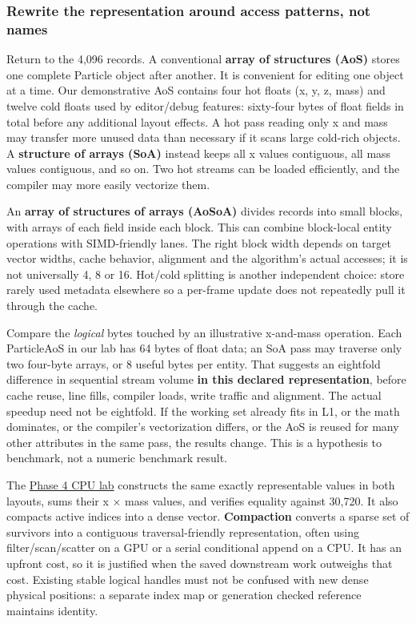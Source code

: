 \subsubsection{Rewrite the representation around access patterns, not names}\label{rewrite-the-representation-around-access-patterns-not-names}

Return to the 4,096 records. A conventional \textbf{array of structures (AoS)} stores one complete Particle object after another. It is convenient for editing one object at a time. Our demonstrative AoS contains four hot floats (x, y, z, mass) and twelve cold floats used by editor/debug features: sixty-four bytes of float fields in total before any additional layout effects. A hot pass reading only x and mass may transfer more unused data than necessary if it scans large cold-rich objects. A \textbf{structure of arrays (SoA)} instead keeps all x values contiguous, all mass values contiguous, and so on. Two hot streams can be loaded efficiently, and the compiler may more easily vectorize them.

An \textbf{array of structures of arrays (AoSoA)} divides records into small blocks, with arrays of each field inside each block. This can combine block-local entity operations with SIMD-friendly lanes. The right block width depends on target vector widths, cache behavior, alignment and the algorithm's actual accesses; it is not universally 4, 8 or 16. Hot/cold splitting is another independent choice: store rarely used metadata elsewhere so a per-frame update does not repeatedly pull it through the cache.

Compare the \emph{logical} bytes touched by an illustrative x-and-mass operation. Each ParticleAoS in our lab has 64 bytes of float data; an SoA pass may traverse only two four-byte arrays, or 8 useful bytes per entity. That suggests an eightfold difference in sequential stream volume \textbf{in this declared representation}, before cache reuse, line fills, compiler loads, write traffic and alignment. The actual speedup need not be eightfold. If the working set already fits in L1, or the math dominates, or the compiler's vectorization differs, or the AoS is reused for many other attributes in the same pass, the results change. This is a hypothesis to benchmark, not a numeric benchmark result.

The \href{tools/labs/phase4_cpu_systems_lab.cpp}{Phase 4 CPU lab} constructs the same exactly representable values in both layouts, sums their x × mass values, and verifies equality against 30,720. It also compacts active indices into a dense vector. \textbf{Compaction} converts a sparse set of survivors into a contiguous traversal-friendly representation, often using filter/scan/scatter on a GPU or a serial conditional append on a CPU. It has an upfront cost, so it is justified when the saved downstream work outweighs that cost. Existing stable logical handles must not be confused with new dense physical positions: a separate index map or generation checked reference maintains identity.

